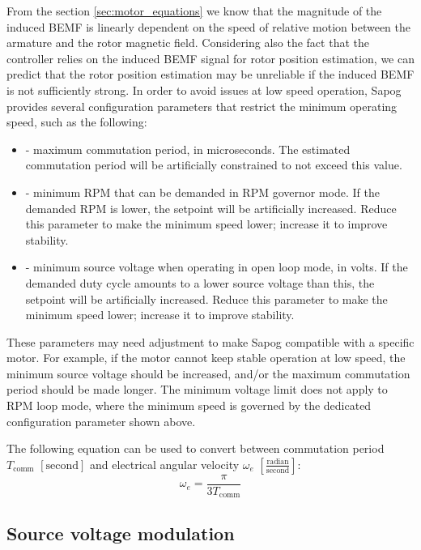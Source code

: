 \documentclass{zubaxdoc}
\begin{document}
From the section \ref{sec:motor_equations} we know that the magnitude of the induced BEMF is linearly
dependent on the speed of relative motion between the armature and the rotor magnetic field.
Considering also the fact that the controller relies on the induced BEMF signal for rotor position estimation,
we can predict that the rotor position estimation may be unreliable if the induced BEMF is not sufficiently
strong.
In order to avoid issues at low speed operation, Sapog provides several configuration parameters that
restrict the minimum operating speed, such as the following:

\begin{itemize}
\item {} - maximum commutation period, in microseconds.
The estimated commutation period will be artificially constrained to not exceed this value.
\item {} - minimum RPM that can be demanded in RPM governor mode.
If the demanded RPM is lower, the setpoint will be artificially increased.
Reduce this parameter to make the minimum speed lower; increase it to improve stability.
\item {} - minimum source voltage when operating in open loop mode, in volts.
If the demanded duty cycle amounts to a lower source voltage than this, the setpoint will be artificially
increased.
Reduce this parameter to make the minimum speed lower; increase it to improve stability.
\end{itemize}

These parameters may need adjustment to make Sapog compatible with a specific motor.
For example, if the motor cannot keep stable operation at low speed,
the minimum source voltage should be increased,
and/or the maximum commutation period should be made longer.
The minimum voltage limit does not apply to RPM loop mode,
where the minimum speed is governed by the dedicated configuration parameter shown above.

The following equation can be used to convert between commutation period $T_\text{comm}$
$\left[\text{second}\right]$
and electrical angular velocity $\omega_e$ $\left[\frac{\text{radian}}{\text{second}}\right]$:
\begin{equation}
\omega_e = \frac{\pi}{3 T_\text{comm}}
\end{equation}

\subsection{Source voltage modulation}
\end{document}
